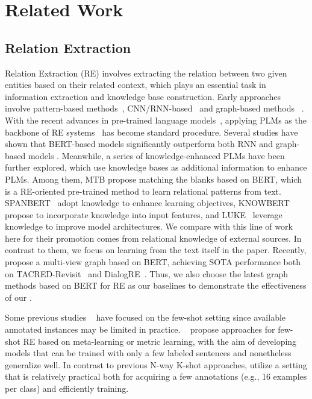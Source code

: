 \documentclass[sigconf]{acmart}
\begin{document}
\section{Related Work}
\subsection{Relation Extraction}
Relation Extraction (RE) involves extracting the relation between two given entities based on their related context, which plays an essential task in information extraction and knowledge base construction.
Early approaches involve pattern-based methods~\citep{DBLP:conf/ijcai/Huffman95,DBLP:conf/aaai/CaliffM99}, CNN/RNN-based~\citep{DBLP:conf/emnlp/ZengLC015,DBLP:conf/acl/ZhouSTQLHX16, DBLP:conf/emnlp/ZhangZCAM17} and graph-based methods ~\cite{DBLP:conf/emnlp/Zhang0M18,DBLP:conf/acl/GuoZL19,guo2020learning}. 
With the recent advances in pre-trained language models~\citep{DBLP:conf/naacl/DevlinCLT19}, applying PLMs as the backbone of RE systems~\cite{www20-Zhou,wang2020finding,li2020logic,AliCG,PRGC,generative_triple,docunet} has become standard procedure. 
Several studies have shown that BERT-based models significantly outperform both RNN and graph-based models \cite{DBLP:conf/cikm/WuH19a,joshi2020spanbert,DBLP:conf/acl/YuSCY20}. 
Meanwhile, a series of knowledge-enhanced PLMs have been further explored, which use knowledge bases as additional information to
enhance PLMs. Among them, MTB\cite{baldini-soares-etal-2019-matching} propose matching the blanks based on BERT, which is a RE-oriented pre-trained method to learn relational patterns from text. 
SPANBERT~\cite{joshi2020spanbert} adopt knowledge to enhance learning objectives, 
KNOWBERT~\cite{peters2019knowledge} propose to incorporate knowledge into input features,
and LUKE~\cite{yamada2020luke} leverage knowledge to improve model architectures.
We compare with this line of work here for their promotion comes from relational knowledge of external sources. In contrast to them, we focus on learning from the text itself in the paper.
Recently, \citet{Fuzhao2021gdpnet} propose a multi-view graph based on BERT, achieving SOTA performance both on TACRED-Revisit~\cite{alt2020tacred} and DialogRE~\cite{DBLP:conf/acl/YuSCY20}.
Thus, we also choose the latest graph methods based on BERT for RE as our baselines to demonstrate the effectiveness of our \ours.


Some previous studies ~\cite{DBLP:journals/corr/abs-2112-10006} have focused on the few-shot setting since available annotated instances may be limited in practice. ~\citet{DBLP:conf/emnlp/HanZYWYLS18,DBLP:conf/aaai/GaoH0S19,DBLP:conf/aaai/GaoHX0LLS20,DBLP:conf/icml/QuGXT20,bridge_triple,DBLP:conf/coling/DongYXGHLLLS20} propose approaches for few-shot RE based on meta-learning or metric learning, with the aim of developing models that can be trained with only a few labeled sentences and nonetheless generalize well. 
In contrast to previous N-way K-shot approaches, \citet{DBLP:journals/corr/abs-2012-15723} utilize a  setting that is relatively practical both for acquiring a few annotations (e.g., 16 examples per class) and efficiently training.
\end{document}
